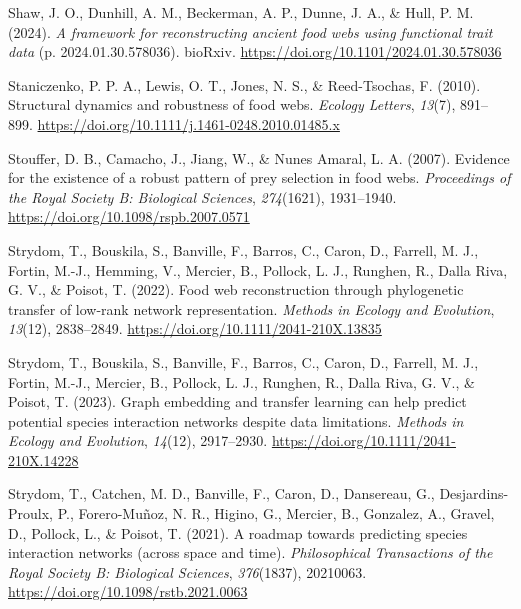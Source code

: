 \documentclass[
]{article}
\newlength{\cslhangindent}
\newenvironment{CSLReferences}[2] %
 {\begin{list}{}{%
  \setlength{\itemindent}{0pt}
  \setlength{\leftmargin}{0pt}
  \setlength{\parsep}{0pt}
  \ifodd #1
   \setlength{\leftmargin}{\cslhangindent}
   \setlength{\itemindent}{-1\cslhangindent}
  \fi
  \setlength{\itemsep}{#2\baselineskip}}}
 {\end{list}}
\begin{document}
\begin{CSLReferences}{1}{0}
Shaw, J. O., Dunhill, A. M., Beckerman, A. P., Dunne, J. A., \& Hull, P.
M. (2024). \emph{A framework for reconstructing ancient food webs using
functional trait data} (p. 2024.01.30.578036). bioRxiv.
\url{https://doi.org/10.1101/2024.01.30.578036}

Staniczenko, P. P. A., Lewis, O. T., Jones, N. S., \& Reed-Tsochas, F.
(2010). Structural dynamics and robustness of food webs. \emph{Ecology
Letters}, \emph{13}(7), 891--899.
\url{https://doi.org/10.1111/j.1461-0248.2010.01485.x}

Stouffer, D. B., Camacho, J., Jiang, W., \& Nunes Amaral, L. A. (2007).
Evidence for the existence of a robust pattern of prey selection in food
webs. \emph{Proceedings of the Royal Society B: Biological Sciences},
\emph{274}(1621), 1931--1940.
\url{https://doi.org/10.1098/rspb.2007.0571}

Strydom, T., Bouskila, S., Banville, F., Barros, C., Caron, D., Farrell,
M. J., Fortin, M.-J., Hemming, V., Mercier, B., Pollock, L. J., Runghen,
R., Dalla Riva, G. V., \& Poisot, T. (2022). Food web reconstruction
through phylogenetic transfer of low-rank network representation.
\emph{Methods in Ecology and Evolution}, \emph{13}(12), 2838--2849.
\url{https://doi.org/10.1111/2041-210X.13835}

Strydom, T., Bouskila, S., Banville, F., Barros, C., Caron, D., Farrell,
M. J., Fortin, M.-J., Mercier, B., Pollock, L. J., Runghen, R., Dalla
Riva, G. V., \& Poisot, T. (2023). Graph embedding and transfer learning
can help predict potential species interaction networks despite data
limitations. \emph{Methods in Ecology and Evolution}, \emph{14}(12),
2917--2930. \url{https://doi.org/10.1111/2041-210X.14228}

Strydom, T., Catchen, M. D., Banville, F., Caron, D., Dansereau, G.,
Desjardins-Proulx, P., Forero-Muñoz, N. R., Higino, G., Mercier, B.,
Gonzalez, A., Gravel, D., Pollock, L., \& Poisot, T. (2021). A roadmap
towards predicting species interaction networks (across space and time).
\emph{Philosophical Transactions of the Royal Society B: Biological
Sciences}, \emph{376}(1837), 20210063.
\url{https://doi.org/10.1098/rstb.2021.0063}


\end{CSLReferences}
\end{document}
